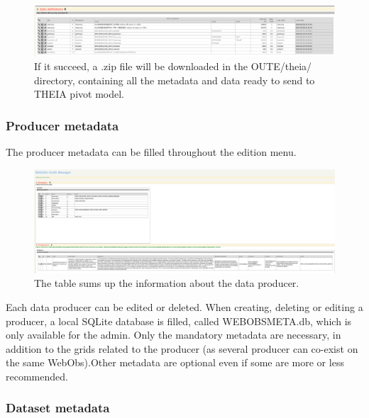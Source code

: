 \begin{figure}[!h]
	\centering
	\includegraphics[scale=0.25]{figures/sendTHEIA.png}
	\caption{If it succeed, a .zip file will be downloaded in the OUTE/theia/ directory, containing all the metadata and data ready to send to THEIA pivot model.}
\end{figure}

\newpage

\subsubsection{Producer metadata}

The producer metadata can be filled throughout the  edition menu. 

\begin{figure}[!h]
	\centering
	\includegraphics[width=\textwidth]{figures/gridsMgr.png}
	\caption{The table sums up the information about the data producer.}
\end{figure}

Each data producer can be edited or deleted. When creating, deleting or editing a producer, a local SQLite database is filled,  called WEBOBSMETA.db, which is only available for the admin. Only the mandatory metadata are necessary, in addition to the grids related to the producer (as several producer can co-exist on the same WebObs).Other metadata are optional even if some are more or less recommended.

\newpage

\subsubsection{Dataset metadata}

